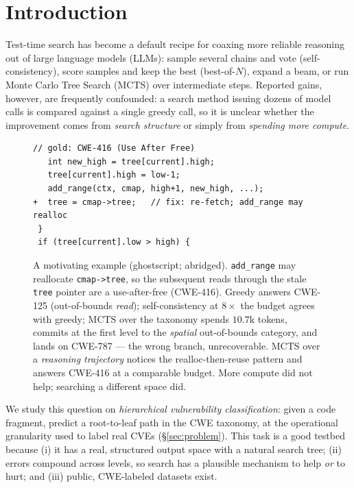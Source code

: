 \section{Introduction}
\label{sec:intro}


Test-time search has become a default recipe for coaxing more reliable reasoning
out of large language models (LLMs): sample several chains and vote
(self-consistency), score samples and keep the best (best-of-$N$), expand a beam,
or run Monte Carlo Tree Search (MCTS) over intermediate steps. Reported gains,
however, are frequently confounded: a search method issuing dozens of model calls
is compared against a single greedy call, so it is unclear whether the
improvement comes from \emph{search structure} or simply from \emph{spending more
compute}.

\begin{figure}[t]
\begin{lstlisting}
// gold: CWE-416 (Use After Free)
   int new_high = tree[current].high;
   tree[current].high = low-1;
   add_range(ctx, cmap, high+1, new_high, ...);
+  tree = cmap->tree;   // fix: re-fetch; add_range may realloc
 }
 if (tree[current].low > high) {
\end{lstlisting}
\caption{A motivating example (ghostscript; abridged). \texttt{add\_range}
may reallocate \texttt{cmap->tree}, so the subsequent reads through the stale
\texttt{tree} pointer are a use-after-free (CWE-416). Greedy answers CWE-125
(out-of-bounds \emph{read}); self-consistency at $8\times$ the budget agrees with
greedy; MCTS over the taxonomy spends $10.7$k tokens, commits at the first level
to the \emph{spatial} out-of-bounds category, and lands on CWE-787 --- the wrong
branch, unrecoverable. MCTS over a \emph{reasoning trajectory} notices the
realloc-then-reuse pattern and answers CWE-416 at a comparable budget. More
compute did not help; searching a different space did.}
\label{fig:motivating}
\end{figure}

We study this question on \emph{hierarchical vulnerability classification}: given
a code fragment, predict a root-to-leaf path in the CWE taxonomy, at the
operational granularity used to label real CVEs (\S\ref{sec:problem}). This task
is a good testbed because (i) it has a real, structured output space with a
natural search tree; (ii) errors compound across levels, so search has a
plausible mechanism to help \emph{or} to hurt; and (iii) public, CWE-labeled
datasets exist.

